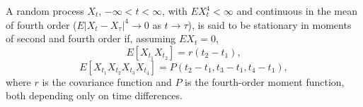 A random process $X_t$, $-\infty < t < \infty$, with $E X_t^4 < \infty$ and continuous in the mean of fourth order ($E|X_t - X_\tau|^4 \to 0$ as $t \to \tau$), is said to be stationary in moments of second and fourth order if, assuming $E X_t = 0$,
$$E[X_{t_1} X_{t_2}] = r(t_2 - t_1),$$
$$E[X_{t_1} X_{t_2} X_{t_3} X_{t_4}] = P(t_2 - t_1, t_3 - t_1, t_4 - t_1),$$
where $r$ is the covariance function and $P$ is the fourth-order moment function, both depending only on time differences.
